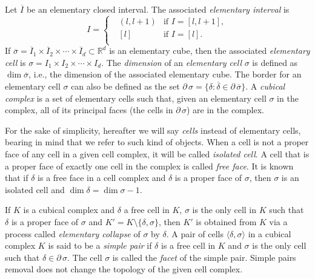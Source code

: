 \documentclass[journal]{IEEEtran}
\begin{document}
Let $\overline{I}$ be an elementary closed interval. The associated \emph{elementary interval} is
$$I =
\left\{
\begin{array}{ll}
\mbox{ }(l, l+1) & \mbox{if } I = [l,l+1],\\
\mbox{ }[l ] & \mbox{if } I = [l ].\\
\end{array}
\right.
$$
\noindent If $\overline{\sigma} = \overline{I}_1 \times \overline{I}_2 \times
\cdots \times \overline{I}_d \subset \mathbb{R}^d$ is an elementary cube, then
the associated \emph{elementary cell} is $ \sigma = I_1 \times I_2 \times \cdots
\times I_d $. The \emph{dimension} of an \emph{elementary cell} $\sigma$ is
defined as $\dim \overline{\sigma}$, i.e., the dimension of the associated
elementary cube. The border for an elementary cell $\sigma$ can also be defined
as the set $\partial\, \sigma = \{\delta: \overline{\delta} \in \partial\,
\overline{\sigma}\}$. A \emph{cubical complex} is a set of elementary cells such
that, given an elementary cell $\sigma$ in the complex, all of its principal
faces (the cells in $\partial\, \sigma$) are in the complex.

For the sake of simplicity, hereafter we will say \emph{cells} instead of
elementary cells, bearing in mind that we refer to such kind of objects. When a
cell is not a proper face of any cell in a given cell complex, it will be called
\emph{isolated cell}. A cell that is a proper face of exactly one cell in the
complex is called \emph{free face}. It is known that if $\delta$ is a free face
in a cell complex and $\delta$ is a proper face of $\sigma$, then $\sigma$ is an
isolated cell and $\dim \delta = \dim \sigma - 1$.

If $K$ is a cubical complex and $\delta$ a free cell in $K$, $\sigma$ is the
only cell in $K$ such that $\delta$ is a proper face of $\sigma$ and
$K'=K\setminus \{\delta, \sigma\}$, then $K'$ is obtained from $K$ via a process
called \emph{elementary collapse} of $\sigma$ by $\delta$.
A pair of cells
$\langle \delta, \sigma \rangle$ in a cubical complex $K$ is said to be a
\emph{simple pair} if $\delta$ is a free cell in $K$ and $\sigma$ is the only
cell such that $\delta \in \partial\, \sigma$. The cell $\sigma$ is called the
\emph{facet} of the simple pair. Simple pairs removal does not change the
topology of the given cell complex.
\end{document}

